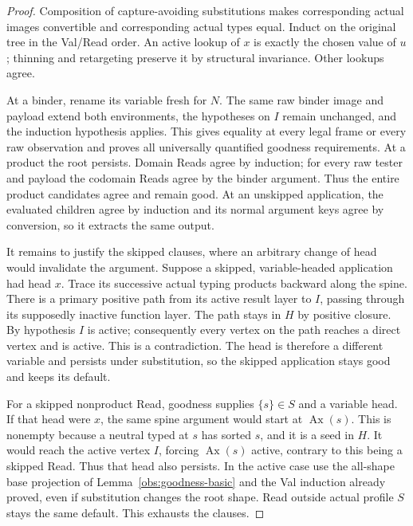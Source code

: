 \begin{proof}
Composition of capture-avoiding substitutions makes corresponding
actual images convertible and corresponding actual types equal.
Induct on the original tree in the Val/Read order.  An active lookup
of $x$ is exactly the chosen value of $u$; thinning and retargeting
preserve it by structural invariance.  Other lookups agree.

At a binder, rename its variable fresh for $N$.  The same raw binder
image and payload extend both environments, the hypotheses on $I$
remain unchanged, and the induction hypothesis applies.  This gives
equality at every legal frame or every raw observation and proves all
universally quantified goodness requirements.  At a product the root
persists.  Domain Reads agree by induction; for every raw tester and
payload the codomain Reads agree by the binder argument.  Thus the
entire product candidates agree and remain good.  At an unskipped
application, the evaluated children agree by induction and its normal
argument keys agree by conversion, so it extracts the same output.

It remains to justify the skipped clauses, where an arbitrary change of
head would invalidate the argument.  Suppose a skipped, variable-headed
application had head $x$.  Trace its successive actual typing products
backward along the spine.  There is a primary positive path from its
active result layer to $I$, passing through its supposedly inactive
function layer.  The path stays in $H$ by positive closure.  By
hypothesis $I$ is active; consequently every vertex on the path reaches
a direct vertex and is active.  This is a contradiction.  The head is
therefore a different variable and persists under substitution, so the
skipped application stays good and keeps its default.

For a skipped nonproduct Read, goodness supplies $\{s\}\in S$ and a
variable head.  If that head were $x$, the same spine argument would
start at $\operatorname{Ax}(s)$.  This is nonempty because a neutral
typed at $s$ has sorted $s$, and it is a seed in $H$.  It would reach
the active vertex $I$, forcing $\operatorname{Ax}(s)$ active, contrary
to this being a skipped Read.  Thus that head also persists.  In the
active case use the all-shape base projection of
Lemma~\ref{obs:goodness-basic} and the Val induction already proved,
even if substitution changes the root shape.  Read outside actual
profile $S$ stays the same default.  This exhausts the clauses.
\end{proof}

